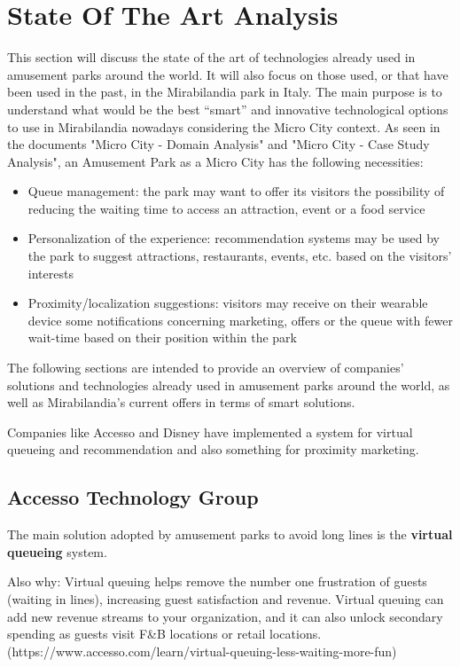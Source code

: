 \section{State Of The Art Analysis}\label{sec:state-of-the-art-analysis}
This section will discuss the state of the art of technologies already used in amusement parks around the world.
It will also focus on those used, or that have been used in the past, in the Mirabilandia park in Italy.
The main purpose is to understand what would be the best ``smart'' and innovative technological options to use in Mirabilandia nowadays considering the Micro City context.
As seen in the documents "Micro City - Domain Analysis" and "Micro City - Case Study Analysis", an Amusement Park as a Micro City has the following necessities:
\begin{itemize}
    \item Queue management: the park may want to offer its visitors the possibility of reducing the waiting time to access an attraction, event or a food service
    \item Personalization of the experience: recommendation systems may be used by the park to suggest attractions, restaurants, events, etc. based on the visitors' interests
    \item Proximity/localization suggestions: visitors may receive on their wearable device some notifications concerning marketing, offers or the queue with fewer wait-time based on their position within the park
\end{itemize}

The following sections are intended to provide an overview of companies' solutions and technologies already used in amusement parks around the world,
as well as Mirabilandia's current offers in terms of smart solutions.

Companies like Accesso and Disney have implemented a system for virtual queueing and recommendation and also something for proximity marketing.

\subsection{Accesso Technology Group}
The main solution adopted by amusement parks to avoid long lines is the \textbf{virtual queueing} system.

Also why: Virtual queuing helps remove the number one frustration of guests (waiting in lines), increasing guest
satisfaction and revenue.
Virtual queuing can add new revenue streams to your organization, and it can also unlock
secondary spending as guests visit F\&B locations or retail locations.
(https://www.accesso.com/learn/virtual-queuing-less-waiting-more-fun)

